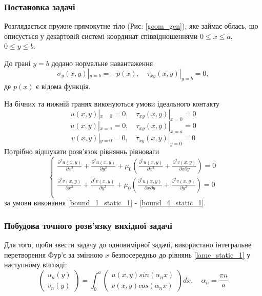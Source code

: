 \subsubsection{Постановка задачі}
Розглядається пружне прямокутне тіло (Рис: \ref{geom_gen}), яке займає облась,
що описується у декартовій системі координат співвідношеннями $0 \le x \le a$, $0 \le y \le b$.

До грані $y=b$ додано нормальне навантаження
\begin{equation}\label{bound_1_static_1}
    \sigma_y(x, y) |_{y=b} = -p(x), \quad  \tau_{xy}(x,y) |_{y=b} =0,
\end{equation}
де $p(x)$ є відома функція.

На бічних та нижній гранях виконуються умови ідеального контакту
\begin{equation}\label{bound_2_static_1}
    u(x,y) |_{x=0} = 0, \quad \tau_{xy}(x,y) |_{x=0} =0
\end{equation}
\begin{equation}\label{bound_3_static_1}
    u(x,y) |_{x=a} = 0, \quad \tau_{xy}(x,y) |_{x=a} =0
\end{equation}
\begin{equation}\label{bound_4_static_1}
    v(x,y) |_{y=0} = 0, \quad \tau_{xy}(x,y) |_{y=0} =0
\end{equation}
Потрібно відшукати розв'язок рівняннь рівноваги
\begin{equation}\label{lame_static_1}
    \begin{cases}
        \frac{\partial^2 u(x,y)}{\partial x^2} + \frac{\partial^2 u(x,y)}{\partial y^2} + \mu_0 (\frac{\partial^2 u(x,y)}{\partial x^2} + \frac{\partial^2 v(x,y)}{\partial x\partial y}) = 0 \\
        \frac{\partial^2 v(x,y)}{\partial x^2} + \frac{\partial^2 v(x,y)}{\partial y^2} + \mu_0 (\frac{\partial^2 u(x,y)}{\partial x \partial y} + \frac{\partial^2 v(x,y)}{\partial y^2}) = 0 \\
    \end{cases}
\end{equation}
за умови виконання \eqref{bound_1_static_1} - \eqref{bound_4_static_1}.

\subsubsection{Побудова точного розв'язку вихідної задачі}
Для того, щоби звести задачу до одновимірної задачі, використано інтегральне перетворення Фур'є за змінною $x$ безпосередньо до рівнянь \eqref{lame_static_1} у наступному вигляді:
\begin{equation}
    \begin{pmatrix}
        u_n(y) \\
        v_n(y)
    \end{pmatrix} = \int_{0}^{a} 
    \begin{pmatrix}
        u(x,y) sin(\alpha_n x) \\
        v(x,y) cos(\alpha_n x)
    \end{pmatrix} dx, \quad \alpha_n = \frac{\pi n}{a}
\end{equation}

